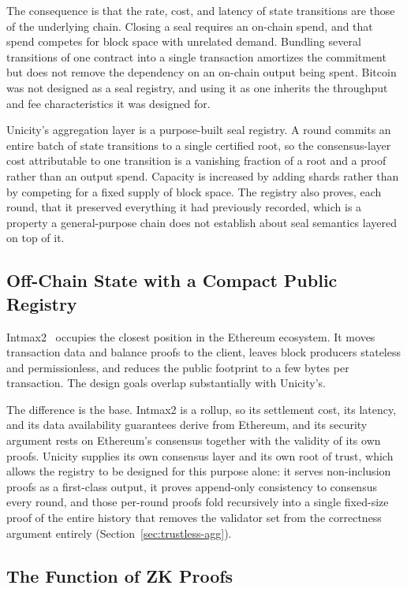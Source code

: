 The consequence is that the rate, cost, and latency of state transitions are those of the underlying chain. Closing a seal requires an on-chain spend, and that spend competes for block space with unrelated demand. Bundling several transitions of one contract into a single transaction amortizes the commitment but does not remove the dependency on an on-chain output being spent. Bitcoin was not designed as a seal registry, and using it as one inherits the throughput and fee characteristics it was designed for.

Unicity's aggregation layer is a purpose-built seal registry. A round commits an entire batch of state transitions to a single certified root, so the consensus-layer cost attributable to one transition is a vanishing fraction of a root and a proof rather than an output spend. Capacity is increased by adding shards rather than by competing for a fixed supply of block space. The registry also proves, each round, that it preserved everything it had previously recorded, which is a property a general-purpose chain does not establish about seal semantics layered on top of it.

\subsection{Off-Chain State with a Compact Public Registry}

Intmax2~\cite{intmax2} occupies the closest position in the Ethereum ecosystem. It moves transaction data and balance proofs to the client, leaves block producers stateless and permissionless, and reduces the public footprint to a few bytes per transaction. The design goals overlap substantially with Unicity's.

The difference is the base. Intmax2 is a rollup, so its settlement cost, its latency, and its data availability guarantees derive from Ethereum, and its security argument rests on Ethereum's consensus together with the validity of its own proofs. Unicity supplies its own consensus layer and its own root of trust, which allows the registry to be designed for this purpose alone: it serves non-inclusion proofs as a first-class output, it proves append-only consistency to consensus every round, and those per-round proofs fold recursively into a single fixed-size proof of the entire history that removes the validator set from the correctness argument entirely (Section~\ref{sec:trustless-agg}).

\subsection{The Function of ZK Proofs}

